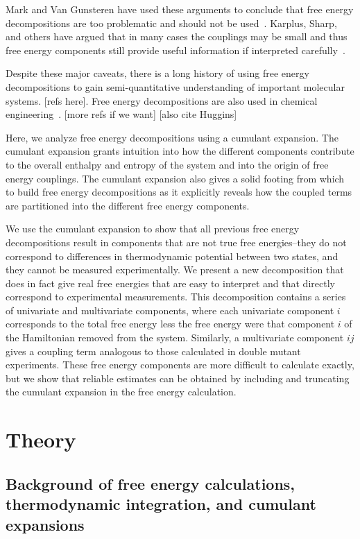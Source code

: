 \documentclass{article}
\begin{document}
Mark and Van Gunsteren have used these arguments to conclude that free energy decompositions are too problematic and should not be used~\cite{Smith:1994tn,Mark:1994un}. Karplus, Sharp, and others have argued that in many cases the couplings may be small and thus free energy components still provide useful information if interpreted carefully~\cite{Boresch:1994jj,Brady:1995dz,Boresch:1995ux,Archontis:1996ef}. 

Despite these major caveats, there is a long history of using free energy decompositions to gain semi-quantitative understanding of important molecular systems. [refs here]. Free energy decompositions are also used in chemical engineering~\cite{Dixit:2011cl,Gu:2017ec}. [more refs if we want] [also cite Huggins]

Here, we analyze free energy decompositions using a cumulant expansion. The cumulant expansion grants intuition into how the different components contribute to the overall enthalpy and entropy of the system and into the origin of free energy couplings. The cumulant expansion also gives a solid footing from which to build free energy decompositions as it explicitly reveals how the coupled terms are partitioned into the different free energy components. 

We use the cumulant expansion to show that all previous free energy decompositions result in components that are not true free energies--they do not correspond to differences in thermodynamic potential between two states, and they cannot be measured experimentally. We present a new decomposition that does in fact give real free energies that are easy to interpret and that directly correspond to experimental measurements.  This decomposition contains a series of univariate and multivariate components, where each univariate component $i$ corresponds to the total free energy less the free energy were that component $i$ of the Hamiltonian removed from the system. Similarly, a multivariate component $ij$ gives a coupling term analogous to those calculated in double mutant experiments. These free energy components are more difficult to calculate exactly, but we show that reliable estimates can be obtained by including and truncating the cumulant expansion in the free energy calculation. 

\section{Theory}


\subsection{Background of free energy calculations, thermodynamic integration, and cumulant expansions}
\end{document}
